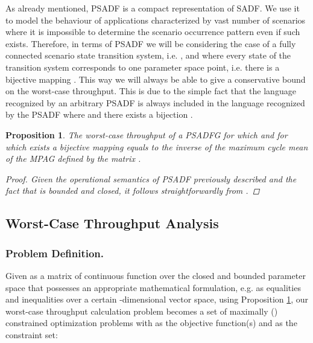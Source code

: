 \documentclass[]{eptcs}
\newtheorem{myprop}{Proposition}
\begin{document}
As already  mentioned, PSADF is a compact representation of SADF. We use it to model the behaviour of applications characterized by vast number of scenarios where it is impossible to determine the scenario occurrence pattern even if such exists. Therefore, in terms of PSADF we will be considering the case of a fully connected scenario state transition system, i.e. , and where every state of the transition system corresponds to one parameter space point, i.e. there is a bijective mapping . This way we will always be able to give a conservative bound on the worst-case throughput. This is due to the simple fact that the language recognized by an arbitrary PSADF  is always included in the language recognized by the PSADF  where  and there exists a bijection .
\begin{myprop}
\label{prop:wct}
The worst-case throughput of a PSADFG for which  and for which exists a bijective mapping  equals to the inverse of the maximum cycle mean of the MPAG defined by the matrix .
\begin{proof}
Given the operational semantics of PSADF previously described and the fact that  is bounded and closed, it follows straightforwardly from \cite{2geil:all}\cite{2gaub}.
\end{proof}
\end{myprop}
\subsection{Worst-Case Throughput Analysis}
\subsubsection{Problem Definition.}
Given  as a matrix of continuous function over the closed and bounded parameter space  that possesses an appropriate mathematical formulation, e.g. as equalities and inequalities over a certain -dimensional vector space, using Proposition \ref{prop:wct}, our worst-case throughput calculation problem becomes a set of maximally () constrained optimization problems with  as the objective function(s) and  as the constraint set:
\\\\
\end{document}
